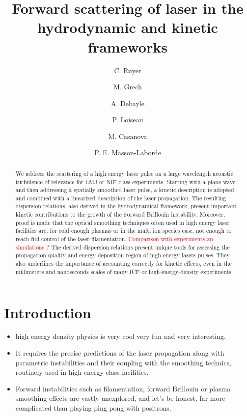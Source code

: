 \documentclass[
 reprint,
 amsmath,amssymb,
 aps,
]{revtex4-1}
\begin{document}
\title{ 
Forward scattering of  laser in the hydrodynamic and kinetic frameworks }
\author{C. Ruyer}
\author{M. Grech}
\author{A. Debayle}
\author{P. Loiseau}
\author{M. Casanova}
\author{P. E. Masson-Laborde}

\begin{abstract}
We address the scattering of a high energy laser pulse on a   large wavelength acoustic turbulence of relevance for LMJ or NIF-class  experiments. 
Starting with a plane wave and then addressing a spatially smoothed laser pulse, 
a kinetic description is adopted and combined with a linearized  description of the laser propagation. The resulting dispersion relations, also derived in the hydrodynamical framework, present important kinetic  contributions to the growth of the Forward Brillouin instability.  
Moreover, proof is made that the optical smoothing techniques  often used in high energy laser facilities are, for cold enough plasmas or in the multi ion species case, not enough to reach full control of the laser filamentation.
\textcolor{red}{Comparison with experiments an simulations ?}
The   derived dispersion relations  present unique tools for assessing the propagation quality and energy deposition region of high energy lasers pulses. They also underlines the importance of accounting correctly for kinetic effects, even in the millimeters and nanoseconds scales of many  ICF or high-energy-density experiments. 
\end{abstract}

\maketitle

\section{Introduction}

\begin{itemize}
    \item high energy density physics is very cool very  fun and very interesting.
    \item It requires the precise predictions of the  laser propagation  along with parametric instabilities and their coupling with the smoothing technics, routinely used in high energy class facilities.  
    \item Forward instabilities such as filamentation, forward Brillouin  or plasma smoothing effects \cite[]{ POP_Grech_2006,PRL_Grech_2009} are vastly unexplored, and let's be honest, far more complicated than playing ping pong with positrons.
\end{itemize}
\end{document}
